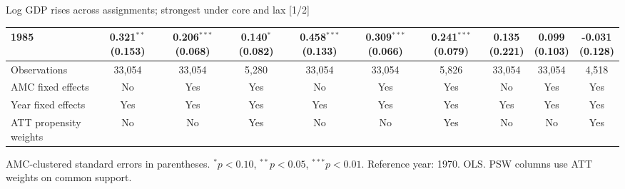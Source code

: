 \documentclass[aspectratio=169]{beamer}
\begin{document}
\begin{frame}{Log GDP rises across assignments; strongest under core and lax [1/2]}
{\begin{tabular}{@{}l*{9}{c}@{}}
1985 & \shortstack{0.321$^{**}$\\(0.153)} & \shortstack{0.206$^{***}$\\(0.068)} & \shortstack{0.140$^{*}$\\(0.082)} & \shortstack{0.458$^{***}$\\(0.133)} & \shortstack{0.309$^{***}$\\(0.066)} & \shortstack{0.241$^{***}$\\(0.079)} & \shortstack{0.135\\(0.221)} & \shortstack{0.099\\(0.103)} & \shortstack{-0.031\\(0.128)} \\
\midrule
Observations & 33,054 & 33,054 & 5,280 & 33,054 & 33,054 & 5,826 & 33,054 & 33,054 & 4,518 \\
AMC fixed effects & No & Yes & Yes & No & Yes & Yes & No & Yes & Yes \\
Year fixed effects & Yes & Yes & Yes & Yes & Yes & Yes & Yes & Yes & Yes \\
ATT propensity weights & No & No & Yes & No & No & Yes & No & No & Yes \\
\bottomrule
\end{tabular}%
}
\vspace{0.1em}
{\tiny\color{ZMidGray} AMC-clustered standard errors in parentheses. $^{*}p<0.10$, $^{**}p<0.05$, $^{***}p<0.01$. Reference year: 1970. OLS. PSW columns use ATT weights on common support.}
\end{frame}
\end{document}
